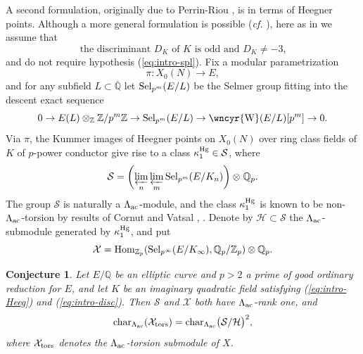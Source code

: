 \documentclass[10pt]{amsart}
\newcommand{\sha}{\text{\wncyr{W}}}
\numberwithin{equation}{section}
\newtheorem{conj}[theorem]{Conjecture}
\theoremstyle{definition}
\theoremstyle{remark}
\newcommand{\Z}{\mathbb{Z}}
\newcommand{\Q}{\mathbb{Q}}
\begin{document}
A second formulation, originally due to Perrin-Riou \cite{perrinriou}, is in terms of Heegner points. Although a more general formulation is possible (\emph{cf.} \cite[\S{2.3}]{CMpconverse}), here as in \cite{perrinriou} we assume that
\begin{equation}\label{eq:intro-disc}
\textrm{the discriminant $D_K$ of $K$ is odd and $D_K\neq -3$,}\tag{disc}
\end{equation}
and do not require hypothesis (\ref{eq:intro-spl}). Fix a modular parametrization
\[
\pi:X_0(N)\rightarrow E,
\]
and for any subfield $L\subset\overline{\Q}$ let ${\rm Sel}_{p^m}(E/L)$ be the Selmer group fitting into the descent exact sequence
\[
0\rightarrow E(L)\otimes_{\Z}\Z/p^m\Z\rightarrow{\rm Sel}_{p^m}(E/L)\rightarrow\sha(E/L)[p^m]\rightarrow 0.
\]
Via $\pi$, the Kummer images of Heegner points on $X_0(N)$ over ring class fields of $K$ of $p$-power conductor give rise to a class $\kappa_1^{\rm Hg}\in\mathcal{S}$, where
\[
\mathcal{S}=\biggl(\varprojlim_n\varprojlim_m{\rm Sel}_{p^m}(E/K_n)\biggr)\otimes_{}\Q_p.
\] 
{The group $\mathcal{S}$ is naturally a $\Lambda_{\rm ac}$-module, and} the class $\kappa_1^{\rm Hg}$ is known to be non-$\Lambda_{\rm ac}$-torsion by results of Cornut and Vatsal \cite{cornut}, \cite{vatsal}. Denote by $\mathcal{H}\subset\mathcal{S}$ the $\Lambda_{\rm ac}$-submodule generated by $\kappa_1^{\rm Hg}$, and put 
\[
\mathcal{X}={\rm Hom}_{\Z_p}({\rm Sel}_{p^\infty}(E/K_\infty),\Q_p/\Z_p)\otimes\Q_p.
\]


\begin{conj}\label{conj:PR}
Let $E/\Q$ be an elliptic curve and $p>2$ a prime of good ordinary reduction for $E$, and let $K$ be an imaginary quadratic field satisfying {\rm(\ref{eq:intro-Heeg})} and {\rm(\ref{eq:intro-disc})}. Then $\mathcal{S}$ and $\mathcal{X}$ both
have $\Lambda_{\rm ac}$-rank one, and
\[
{\rm char}_{\Lambda_{\rm ac}}(\mathcal{X}_{\rm tors})={\rm char}_{\Lambda_{\rm ac}}\bigl(\mathcal{S}/\mathcal{H}\bigr)^2,
\] 
where $\mathcal{X}_{\rm tors}$ denotes the $\Lambda_{\rm ac}$-torsion submodule of $X$. 
\end{conj}
\end{document}
